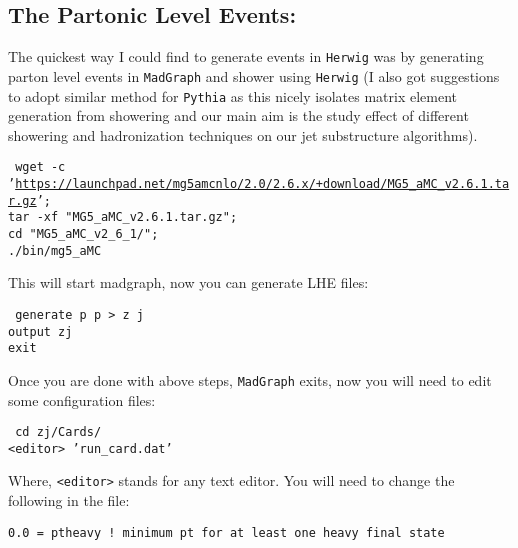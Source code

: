 \subsection{The Partonic Level Events:}
The quickest way I could find to generate events in {\tt Herwig} was by generating parton level events in {\tt MadGraph} and shower using {\tt Herwig} (I also got suggestions to adopt similar method for {\tt Pythia} as this nicely isolates matrix element generation from showering and our main aim is the study effect of different showering and hadronization techniques on our jet substructure algorithms).
\begin{center}
    \begin{minipage}{0.9\textwidth}
        \small{
            { \tt
                wget -c '\url{https://launchpad.net/mg5amcnlo/2.0/2.6.x/+download/MG5_aMC_v2.6.1.tar.gz}';\\
                tar -xf "MG5\_aMC\_v2.6.1.tar.gz";\\
                cd "MG5\_aMC\_v2\_6\_1/";\\
                ./bin/mg5\_aMC
            }
        }
    \end{minipage}
\end{center}
This will start madgraph, now you can generate LHE files:
\begin{center}
    \begin{minipage}{0.7\textwidth}
        {\tt
            generate p p > z j\\
            output zj\\
            exit
        }
    \end{minipage}
\end{center}
Once you are done with above steps, {\tt MadGraph} exits, now you will need to edit some configuration files:
\begin{center}
    \begin{minipage}{0.7\textwidth}
        {\tt
            cd zj/Cards/\\
            <editor> 'run\_card.dat'\\
        }
    \end{minipage}
\end{center}
Where, {\tt <editor>} stands for any text editor. You will need to change the following in the file:
\begin{center}
    \begin{minipage}{0.7\textwidth}
        {\tt 0.0  = ptheavy   ! minimum pt for at least one heavy final state}
    \end{minipage}
\end{center}
